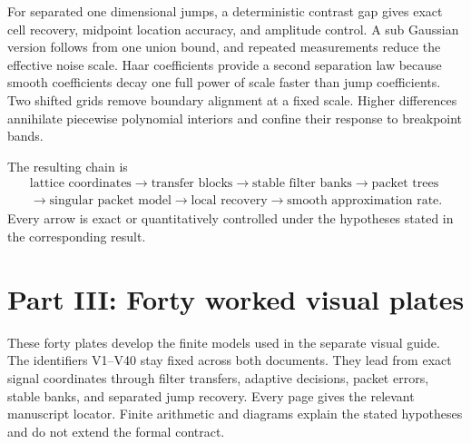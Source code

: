 \documentclass[11pt,letterpaper]{article}
\theoremstyle{plain}
\theoremstyle{plain}
\theoremstyle{plain}
\theoremstyle{definition}
\theoremstyle{definition}
\theoremstyle{definition}
\theoremstyle{definition}
\theoremstyle{remark}
\theoremstyle{remark}
\theoremstyle{remark}
\theoremstyle{remark}
\begin{document}
For separated one dimensional jumps, a deterministic contrast gap gives exact cell recovery, midpoint location accuracy, and amplitude control. A sub Gaussian version follows from one union bound, and repeated measurements reduce the effective noise scale. Haar coefficients provide a second separation law because smooth coefficients decay one full power of scale faster than jump coefficients. Two shifted grids remove boundary alignment at a fixed scale. Higher differences annihilate piecewise polynomial interiors and confine their response to breakpoint bands.

The resulting chain is
\[
\begin{gathered}
\text{lattice coordinates}
\longrightarrow
\text{transfer blocks}
\longrightarrow
\text{stable filter banks}
\longrightarrow
\text{packet trees}
\\
\longrightarrow
\text{singular packet model}
\longrightarrow
\text{local recovery}
\longrightarrow
\text{smooth approximation rate}.
\end{gathered}
\]
Every arrow is exact or quantitatively controlled under the hypotheses stated in the corresponding result.


\clearpage
\part*{Part III: Forty worked visual plates}
\begin{readerroadmap}[title={A second route through the mathematics}]
These forty plates develop the finite models used in the separate visual guide. The identifiers V1--V40 stay fixed across both documents. They lead from exact signal coordinates through filter transfers, adaptive decisions, packet errors, stable banks, and separated jump recovery. Every page gives the relevant manuscript locator. Finite arithmetic and diagrams explain the stated hypotheses and do not extend the formal contract.
\end{readerroadmap}
\clearpage
\begingroup
\setlength{\parskip}{3pt}
\setlength{\abovedisplayskip}{6pt}\setlength{\belowdisplayskip}{6pt}
\fontsize{10}{12}\selectfont

\endgroup
\clearpage



\end{document}
